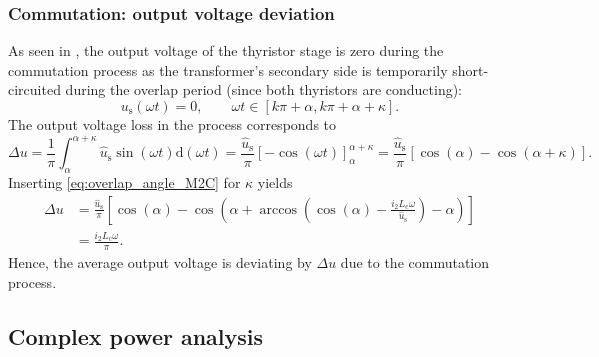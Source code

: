 \begin{frame}[c]
    \frametitle{Commutation: output voltage deviation}
    As seen in , the output voltage of the thyristor stage is zero during the commutation process as the transformer's secondary side is temporarily short-circuited during the overlap period (since both thyristors are conducting):
    \begin{equation}
        u_\mathrm{s}(\omega t) = 0, \qquad \omega t \in [k\pi+\alpha, k\pi+\alpha + \kappa].
    \end{equation}
    The output voltage loss in the process corresponds to
    \begin{equation}
        \Delta u = \frac{1}{\pi}\int_{\alpha}^{\alpha + \kappa} \hat{u}_\mathrm{s}\sin(\omega t) \mathrm{d}(\omega t) = \frac{\hat{u}_\mathrm{s}}{\pi}\left[-\cos(\omega t)\right]_{\alpha}^{\alpha + \kappa} = \frac{\hat{u}_\mathrm{s}}{\pi}\left[\cos(\alpha) - \cos(\alpha + \kappa)\right].
    \end{equation}
    Inserting \eqref{eq:overlap_angle_M2C} for $\kappa$ yields
    \begin{equation}
        \begin{split}
            \Delta u &= \frac{\hat{u}_\mathrm{s}}{\pi}\left[\cos(\alpha) - \cos\left(\alpha + \arccos\left(\cos(\alpha) - \frac{i_2L_\mathrm{c}\omega}{\hat{u}_\mathrm{s}}\right) - \alpha\right)\right]\\
                     &=\frac{i_2L_\mathrm{c}\omega}{\pi}.
        \end{split}
    \end{equation}
    Hence, the average output voltage is deviating by $\Delta u$ due to the commutation process.
\end{frame}

\subsection{Complex power analysis} 


